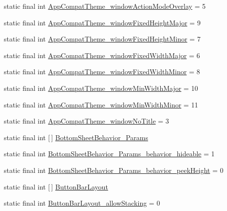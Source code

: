 \begin{DoxyCompactItemize}
\item 
static final int \hyperlink{classproject4_1_1xaria_1_1R_1_1styleable_a90154482a964f6451f06f63075d14158}{App\+Compat\+Theme\+\_\+window\+Action\+Mode\+Overlay} = 5
\item 
static final int \hyperlink{classproject4_1_1xaria_1_1R_1_1styleable_afbfad678390f6ef619822aaa4c394909}{App\+Compat\+Theme\+\_\+window\+Fixed\+Height\+Major} = 9
\item 
static final int \hyperlink{classproject4_1_1xaria_1_1R_1_1styleable_a9110b2aa58050cacc46ad38d156924e2}{App\+Compat\+Theme\+\_\+window\+Fixed\+Height\+Minor} = 7
\item 
static final int \hyperlink{classproject4_1_1xaria_1_1R_1_1styleable_ad301f019de6ddcbce43d7e5d1f6e3e25}{App\+Compat\+Theme\+\_\+window\+Fixed\+Width\+Major} = 6
\item 
static final int \hyperlink{classproject4_1_1xaria_1_1R_1_1styleable_afc006d05a67568d40092e9c8b6d65ca5}{App\+Compat\+Theme\+\_\+window\+Fixed\+Width\+Minor} = 8
\item 
static final int \hyperlink{classproject4_1_1xaria_1_1R_1_1styleable_a1800907132f2a32eb4cf09127ecc7edc}{App\+Compat\+Theme\+\_\+window\+Min\+Width\+Major} = 10
\item 
static final int \hyperlink{classproject4_1_1xaria_1_1R_1_1styleable_af7746fda2052e3559e17aae4ea7bd140}{App\+Compat\+Theme\+\_\+window\+Min\+Width\+Minor} = 11
\item 
static final int \hyperlink{classproject4_1_1xaria_1_1R_1_1styleable_ad3263d106700d1119508ee7eae3c01e2}{App\+Compat\+Theme\+\_\+window\+No\+Title} = 3
\item 
static final int \mbox{[}$\,$\mbox{]} \hyperlink{classproject4_1_1xaria_1_1R_1_1styleable_ad80ceca30648e8c60ba2898c9560a573}{Bottom\+Sheet\+Behavior\+\_\+\+Params}
\item 
static final int \hyperlink{classproject4_1_1xaria_1_1R_1_1styleable_a231009c3ef6da1d5c6c2953970a8d053}{Bottom\+Sheet\+Behavior\+\_\+\+Params\+\_\+behavior\+\_\+hideable} = 1
\item 
static final int \hyperlink{classproject4_1_1xaria_1_1R_1_1styleable_a8e3e2f702f3e393d6ad11344e517a348}{Bottom\+Sheet\+Behavior\+\_\+\+Params\+\_\+behavior\+\_\+peek\+Height} = 0
\item 
static final int \mbox{[}$\,$\mbox{]} \hyperlink{classproject4_1_1xaria_1_1R_1_1styleable_ad7c5e25ea8375a04aba691097eab654d}{Button\+Bar\+Layout}
\item 
static final int \hyperlink{classproject4_1_1xaria_1_1R_1_1styleable_a6ef4a258dc721188ad3bda92997bfbb9}{Button\+Bar\+Layout\+\_\+allow\+Stacking} = 0

\end{DoxyCompactItemize}
